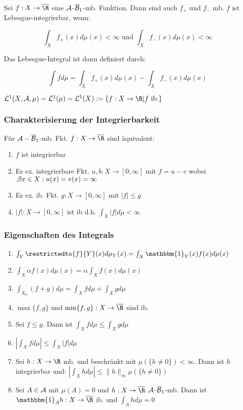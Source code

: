 Sei $f : X \to \overline\R$ eine $\mathcal{A}$-$\overline{\mathcal{B}}_1$-mb. Funktion. Dann sind auch $f_+$ und $f_-$ mb. $f$ ist Lebesgue-integrierbar, wenn:

\vspace{-4mm}
$$\int_X f_+(x) d\mu(x) < \infty \text{ und } \int_X f_-(x) d\mu(x) < \infty$$

Das Lebesgue-Integral ist dann definiert durch:

$$\int f d\mu = \int_X f_+(x) d\mu(x) - \int_X f_-(x) d\mu(x)$$

$\L^1(X,\A,\mu) = \L^1(\mu) = \L^1(X) := \{ f : X \to \R | f \text{ ib.}\}$

\subsubsection*{Charakterisierung der Integrierbarkeit}

Für $\mathcal{A}-\overline{\mathcal{B}}_1$-mb. Fkt. $f : X \to \overline\R$ sind äquivalent:

\begin{enumerate}[label=(\alph*)]
	\item $f$ ist integrierbar
	\item Es ex. integrierbare Fkt. $u, b : X \to [0,\infty]$ mit $f=u-v$ wobei $\not\exists x \in X : u(x)=v(x)=\infty$
	\item Es ex. ib. Fkt. $g : X \to [0,\infty]$ mit $|f| \leq g$
	\item $|f| : X \to [0,\infty]$ ist ib d.h. $\int_X |f| d\mu < \infty$
\end{enumerate}

\subsubsection*{Eigenschaften des Integrals}

\begin{enumerate}[label=(\alph*)]
	\item $\int_Y \restrictedto{f}{Y}(x) d\mu_Y(x) = \int_X \mathbbm{1}_Y(x) f(x) d\mu(x)$
	\item $\int_X \alpha f(x) d\mu(x) = \alpha \int_X f(x) d\mu(x)$
	\item $\int_{X_0} (f + g) d\mu = \int_X f d\mu + \int_X g d\mu$
	\item $\max\{f,g\}$ und $\min\{f,g\} : X \to \overline\R$ sind ib.
	\item Sei $f \leq g$. Dann ist $\int_X f d\mu \leq \int_X g d\mu$
	\item $|\int_X f d\mu| \leq \int_X |f| d\mu$
	\item Sei $h : X \to \R$ mb. und beschränkt mit $\mu(\{h \neq 0\}) < \infty$. Dann ist $h$ integrierbar und: $|\int_X h d\mu| \leq \|h\|_\infty \mu(\{h \neq 0\})$
	\item Sei $A \in \mathcal{A}$ mit $\mu(A) = 0$ und $h : X \to \overline\R$ $\mathcal{A}$-$\overline{\mathcal{B}}_1$-mb. Dann ist $\mathbbm{1}_A h : X \to \overline\R$ ib. und $\int_A h d\mu = 0$
\end{enumerate}

